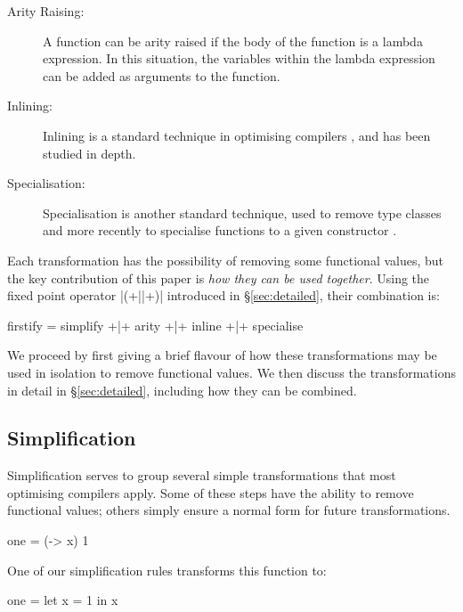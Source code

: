 \begin{description}
\item[Arity Raising:] A function can be arity raised if the body of the function is a lambda expression. In this situation, the variables within the lambda expression can be added as arguments to the function.
\item[Inlining:] Inlining is a standard technique in optimising compilers \cite{spj:inlining}, and has been studied in depth.
\item[Specialisation:] Specialisation is another standard technique, used to remove type classes \cite{jones:dictionary_free} and more recently to specialise functions to a given constructor \cite{spj:specconstr}.
\end{description}

Each transformation has the possibility of removing some functional values, but the key contribution of this paper is \textit{how they can be used together}. Using the fixed point operator |(+||+)| introduced in \S\ref{sec:detailed}, their combination is:

\begin{code}
firstify = simplify +|+ arity +|+ inline +|+ specialise
\end{code}

We proceed by first giving a brief flavour of how these transformations may be used in isolation to remove functional values. We then discuss the transformations in detail in \S\ref{sec:detailed}, including how they can be combined.

\subsection{Simplification}

Simplification serves to group several simple transformations that most optimising compilers apply. Some of these steps have the ability to remove functional values; others simply ensure a normal form for future transformations.

\begin{example}
\begin{code}
one = (\x -> x) 1
\end{code}

\noindent One of our simplification rules transforms this function to:

\begin{code}
one = let x = 1 in x
\end{code}
\end{example}

